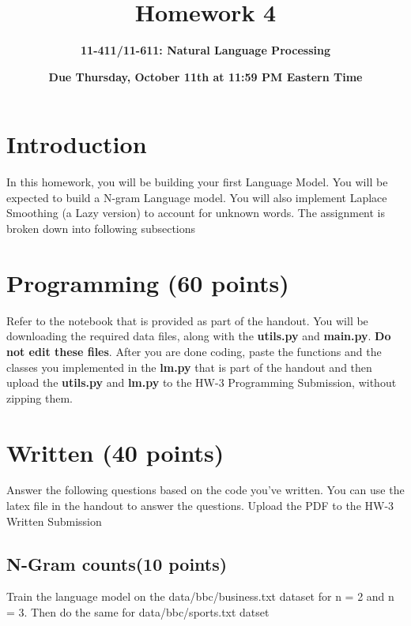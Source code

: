\documentclass{exam}
\begin{document}
\title{Homework 4}
\author{\Large \bf 11-411/11-611: Natural Language Processing}
\date{{\bf Due Thursday, October 11th at 11:59 PM Eastern Time}}
\maketitle

\section{Introduction}
In this homework, you will be building your first Language Model. You will be expected to build a N-gram Language model. You will also implement Laplace Smoothing (a Lazy version) to account for unknown words. The assignment is broken down into following subsections 

 \section{Programming (60 points)}
Refer to the notebook that is provided as part of the handout. You will be downloading the required data files, along with the \textbf{utils.py} and \textbf{main.py}. \textbf{Do not edit these files}. After you are done coding, paste the functions and the classes you implemented in the \textbf{lm.py} that is part of the handout and then upload the \textbf{utils.py} and \textbf{lm.py} to the HW-3 Programming Submission, without zipping them.

\section{Written (40 points)}
Answer the following questions based on the code you've written. You can use the latex file in the handout to answer the questions. Upload the PDF to the HW-3 Written Submission 

\subsection{N-Gram counts(10 points)}
Train the language model on the data/bbc/business.txt dataset for n = 2 and n = 3. Then do the same for data/bbc/sports.txt datset
\end{document}
